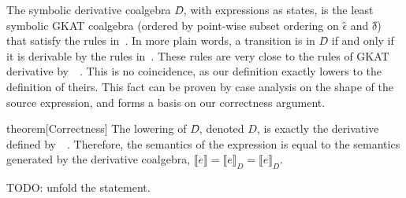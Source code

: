 \documentclass[conference]{IEEEtran}
\begin{document}
The symbolic derivative coalgebra \(D̂\), with expressions as states, is the least symbolic GKAT coalgebra (ordered by point-wise subset ordering on \(ϵ̂\) and \(δ̂\)) that satisfy the rules in~.
In more plain words, a transition is in \(D̂\) if and only if it is derivable by the rules in~.
These rules are very close to the rules of GKAT derivative by~\citeauthor{schmid_GuardedKleeneAlgebra_2021}~\cite{schmid_GuardedKleeneAlgebra_2021}.
This is no coincidence, as our definition exactly lowers to the definition of theirs.
This fact can be proven by case analysis on the shape of the source expression, and forms a basis on our correctness argument.
\begin{theoremEnd}{theorem}[Correctness]\label{thm:derivative-correctness}
    The lowering of \(D̂\), denoted \(D\), is exactly the derivative defined by~\citeauthor{schmid_GuardedKleeneAlgebra_2021}~\cite{schmid_GuardedKleeneAlgebra_2021}.
    Therefore, the semantics of the expression is equal to the semantics generated by the derivative coalgebra, \(⟦e⟧ = ⟦e⟧_{D} = ⟦e⟧_{D̂}\).
\end{theoremEnd}
\begin{proofEnd}
    TODO: unfold the statement.
\end{proofEnd}
\end{document}
